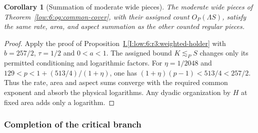 \documentclass[11pt]{amsart}
\newtheorem{corollary}[theorem]{Corollary}
\theoremstyle{definition}
\theoremstyle{remark}
\numberwithin{equation}{section}
\newcommand{\partIref}[1]{\hyperref[I:#1]{I.\ref*{I:#1}}}
\begin{document}
\begin{corollary}[Summation of moderate wide pieces]\label{low:6:wc36:summation}
The moderate wide pieces of Theorem~\ref{low:6:og:common-cover}, with their assigned count $O_P(\Lambda S)$, satisfy the same rate, area, and aspect summation as the other counted regular pieces.
\end{corollary}
\begin{proof}
Apply the proof of Proposition~\partIref{low:6:r3:weighted-holder} with $b=257/2$, $\tau=1/2$ and $0<a<1$. The assigned bound $K\lesssim_PS$ changes only its permitted conditioning and logarithmic factors. For $\eta=1/2048$ and $129<p<1+(513/4)/(1+\eta)$, one has $(1+\eta)(p-1)<513/4<257/2$. Thus the rate, area and aspect sums converge with the required common exponent and absorb the physical logarithms. Any dyadic organization by $H$ at fixed area adds only a logarithm.
\end{proof}

\subsubsection{Completion of the critical branch}
\end{document}
